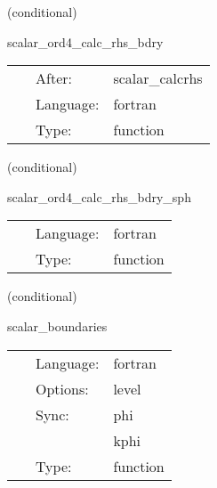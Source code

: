 \vspace{5mm}

   (conditional) 

\hspace{5mm} scalar\_ord4\_calc\_rhs\_bdry 

\hspace{5mm}{\it mol boundary rhs calculation for scalar variables } 


\hspace{5mm}

 \begin{tabular*}{160mm}{cll} 
~ & After:  & scalar\_calcrhs \\ 
~ & Language:  & fortran \\ 
~ & Type:  & function \\ 
\end{tabular*} 


\vspace{5mm}

   (conditional) 

\hspace{5mm} scalar\_ord4\_calc\_rhs\_bdry\_sph 

\hspace{5mm}{\it mol boundary rhs calculation for scalar variables for the multipatch system } 


\hspace{5mm}

 \begin{tabular*}{160mm}{cll} 
~ & Language:  & fortran \\ 
~ & Type:  & function \\ 
\end{tabular*} 


\vspace{5mm}

   (conditional) 

\hspace{5mm} scalar\_boundaries 

\hspace{5mm}{\it mol boundary enforcement for scalar variables } 


\hspace{5mm}

 \begin{tabular*}{160mm}{cll} 
~ & Language:  & fortran \\ 
~ & Options:  & level \\ 
~ & Sync:  & phi \\ 
~& ~ &kphi\\ 
~ & Type:  & function \\ 
\end{tabular*} 


